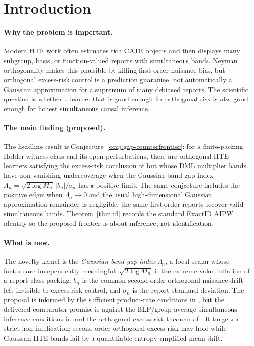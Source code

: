 \documentclass[11pt]{article}
\theoremstyle{definition}
\theoremstyle{plain}
\theoremstyle{remark}
\begin{document}
\section{Introduction}
\paragraph{Why the problem is important.}
Modern HTE work often estimates rich CATE objects and then displays many
subgroup, basis, or function-valued reports with simultaneous bands.  Neyman
orthogonality makes this plausible by killing first-order nuisance bias, but
orthogonal excess-risk control is a prediction guarantee, not automatically a
Gaussian approximation for a supremum of many debiased reports.  The scientific
question is whether a learner that is good enough for orthogonal risk is also
good enough for honest simultaneous causal inference.

\paragraph{The main finding (proposed).}
The headline result is Conjecture~\ref{conj:gap-counterfrontier}: for a
finite-packing Holder witness class and its open perturbations, there are
orthogonal HTE learners satisfying the excess-risk conclusion of
\citet{FosterSyrgkanis2023OSL} but whose DML multiplier bands have non-vanishing
undercoverage when the Gaussian-band gap index
\(\Lambda_n=\sqrt{2\log M_n}\,|b_n|/\sigma_n\) has a positive limit.  The same
conjecture includes the positive edge: when \(\Lambda_n\to0\) and the usual
high-dimensional Gaussian approximation remainder is negligible, the same
first-order reports recover valid simultaneous bands.  Theorem~\ref{thm:id}
records the standard ExactID AIPW identity so the proposed frontier is about
inference, not identification.

\paragraph{What is new.}
The novelty kernel is the \emph{Gaussian-band gap index}
\(\Lambda_n\), a focal scalar whose factors are independently meaningful:
\(\sqrt{2\log M_n}\) is the extreme-value inflation of a report-class packing,
\(b_n\) is the common second-order orthogonal nuisance drift left invisible to
excess-risk control, and \(\sigma_n\) is the report standard deviation.  The
proposal is informed by the sufficient product-rate conditions in
\citet{ChernozhukovEtAl2018DML}, but the delivered comparator promise is
against the BLP/group-average simultaneous inference conditions in
\citet{SemenovaChernozhukov2021DMLCATE} and the orthogonal excess-risk theorem
of \citet{FosterSyrgkanis2023OSL}.  It targets a strict
non-implication: second-order orthogonal excess risk may hold while Gaussian
HTE bands fail by a quantifiable entropy-amplified mean shift.
\end{document}
